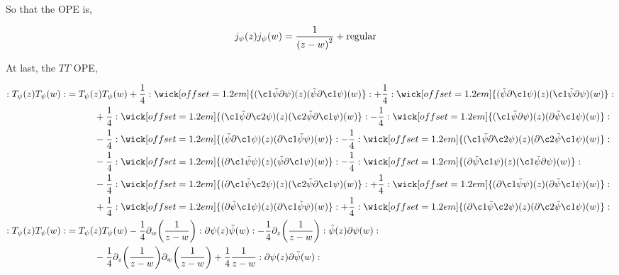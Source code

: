 So that the OPE is,

\begin{align*}
    j_\psi\qty(z)j_\psi\qty(w)&=\frac{1}{\qty(z-w)^2}+\textnormal{regular}
\end{align*}

At last, the $TT$ OPE,

\begin{align*}
    \cnord{T_\psi\qty(z)T_\psi\qty(w)}&=T_\psi\qty(z)T_\psi\qty(w)+\frac14\cnord{\wick[offset=1.2em]{(\c1{\tilde\psi}\partial\psi)\qty(z)(\tilde\psi\partial\c1\psi)\qty(w)}}+\frac14\cnord{\wick[offset=1.2em]{(\tilde\psi\partial\c1\psi)\qty(z)(\c1{\tilde\psi}\partial\psi)\qty(w)}}\\
    &\quad\quad\quad+\frac14\cnord{\wick[offset=1.2em]{(\c1{\tilde\psi}\partial\c2\psi)\qty(z)(\c2{\tilde\psi}\partial\c1\psi)\qty(w)}}-\frac14\cnord{\wick[offset=1.2em]{(\c1{\tilde\psi}\partial\psi)\qty(z)(\partial\tilde\psi\c1\psi)\qty(w)}}\\
    &\quad\quad\quad-\frac14\cnord{\wick[offset=1.2em]{(\tilde\psi\partial\c1\psi)\qty(z)(\partial\c1{\tilde\psi}\psi)\qty(w)}}-\frac14\cnord{\wick[offset=1.2em]{(\c1{\tilde\psi}\partial\c2\psi)\qty(z)(\partial\c2{\tilde\psi}\c1\psi)\qty(w)}}\\
    &\quad\quad\quad-\frac14\cnord{\wick[offset=1.2em]{(\partial\c1{\tilde\psi}\psi)\qty(z)(\tilde\psi\partial\c1\psi)\qty(w)}}-\frac14\cnord{\wick[offset=1.2em]{(\partial\tilde\psi\c1\psi)\qty(z)(\c1{\tilde\psi}\partial\psi)\qty(w)}}\\
    &\quad\quad\quad-\frac14\cnord{\wick[offset=1.2em]{(\partial\c1{\tilde\psi}\c2\psi)\qty(z)(\c2{\tilde\psi}\partial\c1\psi)\qty(w)}}+\frac14\cnord{\wick[offset=1.2em]{(\partial\c1{\tilde\psi}\psi)\qty(z)(\partial\tilde\psi\c1\psi)\qty(w)}}\\
    &\quad\quad\quad+\frac14\cnord{\wick[offset=1.2em]{(\partial\tilde\psi\c1\psi)\qty(z)(\partial\c1{\tilde\psi}\psi)\qty(w)}}+\frac14\cnord{\wick[offset=1.2em]{(\partial\c1{\tilde\psi}\c2\psi)\qty(z)(\partial\c2{\tilde\psi}\c1\psi)\qty(w)}}\\
    \cnord{T_\psi\qty(z)T_\psi\qty(w)}&=T_\psi\qty(z)T_\psi\qty(w)-\frac14\partial_w\qty(\frac{1}{z-w})\cnord{\partial\psi\qty(z)\tilde\psi\qty(w)}-\frac14\partial_z\qty(\frac{1}{z-w})\cnord{\tilde\psi\qty(z)\partial\psi\qty(w)}\\
    &\quad\quad\quad-\frac14\partial_z\qty(\frac{1}{z-w})\partial_w\qty(\frac{1}{z-w})+\frac14\frac{1}{z-w}\cnord{\partial\psi\qty(z)\partial\tilde\psi\qty(w)}\\

\end{align*}
